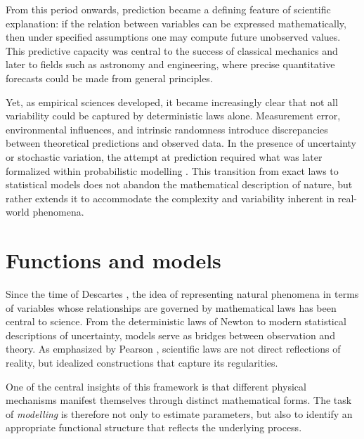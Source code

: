 From this period onwards, prediction became a defining feature of scientific explanation: if the relation between variables can be expressed mathematically, then under specified assumptions one may compute future unobserved values. This predictive capacity was central to the success of classical mechanics and later to fields such as astronomy and engineering, where precise quantitative forecasts could be made from general principles.

\medskip

Yet, as empirical sciences developed, it became increasingly clear that not all variability could be captured by deterministic laws alone. Measurement error, environmental influences, and intrinsic randomness introduce discrepancies between theoretical predictions and observed data. In the presence of uncertainty or stochastic variation, the attempt at prediction required what was later formalized within probabilistic modelling \cite{reichenbach_1938_prediction,cox_2006_principles}. This transition from exact laws to statistical models does not abandon the mathematical description of nature, but rather extends it to accommodate the complexity and variability inherent in real-world phenomena.

\section{Functions and models}

Since the time of Descartes \cite{descartes_1637_geometry}, the idea of representing natural phenomena in terms of variables whose relationships are governed by mathematical laws has been central to science. From the deterministic laws of Newton \cite{newton_1687_principia} to modern statistical descriptions of uncertainty, models serve as bridges between observation and theory. As emphasized by Pearson \cite{pearson_1892_grammar}, scientific laws are not direct reflections of reality, but idealized constructions that capture its regularities.

\medskip

One of the central insights of this framework is that different physical mechanisms manifest themselves through distinct mathematical forms. The task of \textit{modelling} is therefore not only to estimate parameters, but also to identify an appropriate functional structure that reflects the underlying process.

